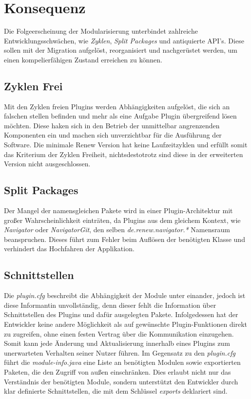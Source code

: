 \section{Konsequenz} \label{auswirkung}
	Die Folgeerscheinung der Modularisierung unterbindet zahlreiche Entwicklungsschwächen, wie \textit{Zyklen}, \textit{Split Packages} und antiquierte API's. Diese sollen mit der Migration aufgelöst, reorganisiert und nachgerüstet werden, um einen kompelierfähigen Zustand erreichen zu können.

\subsection{Zyklen Frei} 
	Mit den Zyklen freien Plugins werden Abhängigkeiten aufgelöst, die sich an falschen stellen befinden und mehr als eine Aufgabe Plugin übergreifend lösen möchten. Diese haken sich in den Betrieb der unmittelbar angrenzenden Komponenten ein und machen sich unverzichtbar für die Ausführung der Software. Die minimale Renew Version hat keine Laufzeitzyklen und erfüllt somit das Kriterium der Zyklen Freiheit, nichtsdestotrotz sind diese in der erweiterten Version nicht ausgeschlossen.

\subsection{Split Packages}
	Der Mangel der namensgleichen Pakete wird in einer Plugin-Architektur mit großer Wahrscheinlichkeit einträten, da Plugins aus dem gleichem Kontext, wie \textit{Navigator} oder \textit{NavigatorGit}, den selben \textit{de.renew.navigator.*} Namensraum beanspruchen. Dieses führt zum Fehler beim Auflösen der benötigten Klasse und verhindert das Hochfahren der Applikation. 

\subsection{Schnittstellen}
	Die \textit{plugin.cfg} beschreibt die Abhängigkeit der Module unter einander, jedoch ist diese Informantin unvollständig, denn dieser fehlt die Information über Schnittstellen des Plugins und dafür ausgelegten Pakete. Infolgedessen hat der Entwickler keine andere Möglichkeit als auf gewünschte Plugin-Funktionen direkt zu zugreifen, ohne einen festen Vertrag über die Kommunikation einzugehen. Somit kann jede Änderung und Aktualisierung innerhalb eines Plugins zum unerwarteten Verhalten seiner Nutzer führen. \newline
	Im Gegensatz zu den \textit{plugin.cfg} führt die \textit{module-info.java} eine Liste an benötigten Modulen sowie exportierten Paketen, die den Zugriff von außen einschränken. Dies erlaubt nicht nur das Verständnis der benötigten Module, sondern unterstützt den Entwickler durch klar definierte Schnittstellen, die mit dem Schlüssel \textit{exports} deklariert sind.

